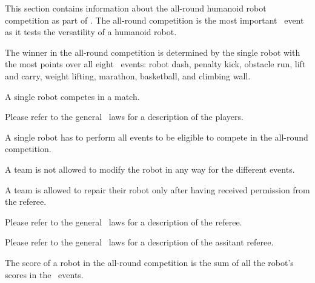 \documentclass[12pt]{hurocup}
\begin{document}
This section contains information about the all-round humanoid robot
competition as part of \HuroCup. The all-round competition is the most
important \HuroCup\ event as it tests the versatility of a humanoid
robot. 

The winner in the all-round competition is determined by the single
robot with the most points over all eight \HuroCup\ events: robot
dash, penalty kick, obstacle run, lift and carry, weight lifting,
marathon, basketball, and climbing wall.


\begin{lawlist}[ALR]
 \item A single robot competes in a match.
\end{lawlist}


Please refer to the general \HuroCup\ laws for a description of
the players.

\begin{lawlist}[ALR]
  
\item A single robot has to perform all events to be eligible to
 compete in the all-round competition.
  
\item A team is not allowed to modify the robot in any way for the
 different events.

\item A team is allowed to repair their robot only after having
 received permission from the referee.
  
\end{lawlist}


Please refer to the general \HuroCup\ laws for a description of
the referee.


Please refer to the general \HuroCup\ laws for a description of
the assitant referee.


\begin{lawlist}[ALR]

\item The score of a robot in the all-round competition is the sum of
 all the robot's scores in the \HuroCup\ events.

\end{lawlist}
\end{document}
